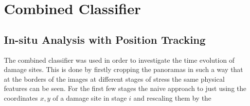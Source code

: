 %
%
%
%
%
%
%
%
\section{Combined Classifier}

\subsection{In-situ Analysis with Position Tracking}
The combined classifier was used in order to investigate the time evolution of damage sites. This is done by firstly cropping the panoramas in such a way that at the borders of the images at different stages of stress the same physical features can be seen. For the first few stages the naive approach to just using the coordinates $x,y$ of a damage site in stage $i$ and rescaling them by the 


















